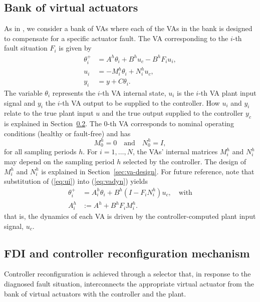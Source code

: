 \documentclass[letterpaper, 10 pt, conference]{ieeeconf}
\newcommand{\dfn}{:=}
\begin{document}
\subsection{Bank of virtual actuators}
\label{sec:bank-va}

As in \cite{seron_bankVA_ifac11}, we consider a bank of VAs where each of the VAs in the bank is designed to compensate for a specific actuator fault.
The VA corresponding to the $i$-th fault situation $F_i$ is given by
\begin{align}
 \label{eq:vadyn}
  \theta^+_i &= A^h\theta_i+B^hu_c-B^hF_iu_i, \\ \label{eq:ui}
  u_i &= -M_i^h\theta_i+N_i^hu_c,\\
  \label{eq:ytheta}
  y_i &= y + C\theta_i.
\end{align}
The variable $\theta_i$ represents the $i$-th VA internal state, $u_i$
is the $i$-th VA plant input signal and $y_i$ the $i$-th VA output to
be supplied to the controller. How $u_i$ and $y_i$ relate to the true
plant input $u$ and the true output supplied to the controller $y_c$
is explained in Section~\ref{sec:sw-logic}. The 0-th VA corresponds to
nominal operating conditions (healthy or fault-free) and has
\begin{equation}
  \label{eq:mn0}
  M^h_0 = 0\quad\text{and}\quad N^h_0= I,
\end{equation}
for all sampling periods $h$. For $i=1,\ldots,N$, the VAs' internal
matrices $M_i^h$ and $N_i^h$ may depend on the sampling period $h$
selected by the controller. The design of $M_i^h$ and $N_i^h$ is
explained in Section~\ref{sec:va-design}. For future reference, note
that substitution of (\ref{eq:ui}) into (\ref{eq:vadyn}) yields
\begin{align}
  \label{eq:vadynsub}
  \theta_i^+ &= A_i^h \theta_i + B^h (I-F_i N_i^h) u_c,\quad\text{with}\\
  \label{eq:Aih}
  A_i^h &\dfn A^h+B^hF_iM_i^h.
\end{align}
that is, the dynamics of each VA is driven by the controller-computed
plant input signal, $u_c$.


\subsection{FDI and controller reconfiguration mechanism} \label{sec:sw-logic}

Controller reconfiguration is achieved through a selector that, in
response to the diagnosed fault situation, interconnects the
appropriate virtual actuator from the bank of virtual actuators with
the controller and the plant.
\end{document}
